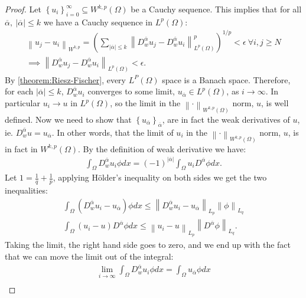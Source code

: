 \documentclass[../Main/main.tex]{subfiles}
\begin{document}
	\begin{proof}
		Let $\left \{  u_i\right \}_{i=0}^{\infty} \subseteq W^{k,p}(\Omega)$ be a Cauchy sequence. This implies that for all $\overline{\alpha}, \  |\overline{\alpha}| \leq k$ we have a Cauchy sequence in $L^p(\Omega)$:
		\begin{gather*}
			\left \| u_j -u_i \right \|_{W^{k,p}} =
			(\sum_{|\overline{\alpha}|\leq k} \left \| D_w^{\overline{\alpha}}u_j - D_w^{\overline{\alpha}}u_i \right \|_{L^p(\Omega)}^p)^{1/p}  < \epsilon \ \forall i,j \geq N \\
			\implies \left \| D_w^{\overline{\alpha}}u_j - D_w^{\overline{\alpha}}u_i \right \|_{L^p(\Omega)} < \epsilon.
		\end{gather*}
		By \eqref{theorem:Riesz-Fischer}, every $L^P(\Omega)$ space is a Banach space. Therefore, for each $|\overline{\alpha}| \leq k$, $D_w^{\overline{\alpha}}u_i $ converges to some limit, $ u_{\overline{\alpha}}\in L^p(\Omega)$, as $i\rightarrow  \infty$. In particular $u_i \rightarrow u$ in  $L^p(\Omega)$, so the limit in the $\left \|\cdot \right \|_{W^{k,p}(\Omega)}$ norm, $u$, is well defined. Now we need to show that $\left \{ u_{\overline{\alpha}} \right \}_{\overline{\alpha}}$, are in fact the weak derivatives of $u$, ie. $D_w^{\overline{\alpha}}u =  u_{\overline{\alpha}}$. In other words, that the limit of $u_i$ in the $\left \|\cdot \right \|_{W^{k,p}(\Omega)}$ norm, $u$, is in fact in $W^{k,p}(\Omega)$. By the definition of weak derivative we have:
		\begin{gather*}
			\int_{\Omega} D_w^{\overline{\alpha}}u_i \phi dx = (-1)^{|\overline{\alpha}|} \int_{\Omega} u_i D^{\overline{\alpha}}\phi dx.
		\end{gather*}
		Let $1=\frac{1}{q}+\frac{1}{p}$, applying Hölder's inequality on both sides we get the two inequalities:
		\begin{gather*}
			\int_{\Omega} (D_w^{\overline{\alpha}}u_i - u_{\overline{\alpha}}) \phi dx \leq \left \| D_w^{\overline{\alpha}}u_i - u_{\overline{\alpha}} \right \|_{L_p} \left \| \phi \right \|_{L_q} \\
			\int_{\Omega} (u_i -u) D^{\overline{\alpha}}\phi dx \leq \left \|u_i -u  \right \|_{L_p} \left \| D^{\overline{\alpha}}\phi \right \|_{L_q}.
		\end{gather*}
		Taking the limit, the right hand side goes to zero, and we end up with the fact that we can move the limit out of the integral:
		\begin{gather*}
			\lim_{i\rightarrow \infty} \int_{\Omega} D_w^{\overline{\alpha}}u_i \phi dx =  \int_{\Omega}u_{\overline{\alpha}} \phi dx \\

\end{gather*}
\end{proof}
\end{document}
